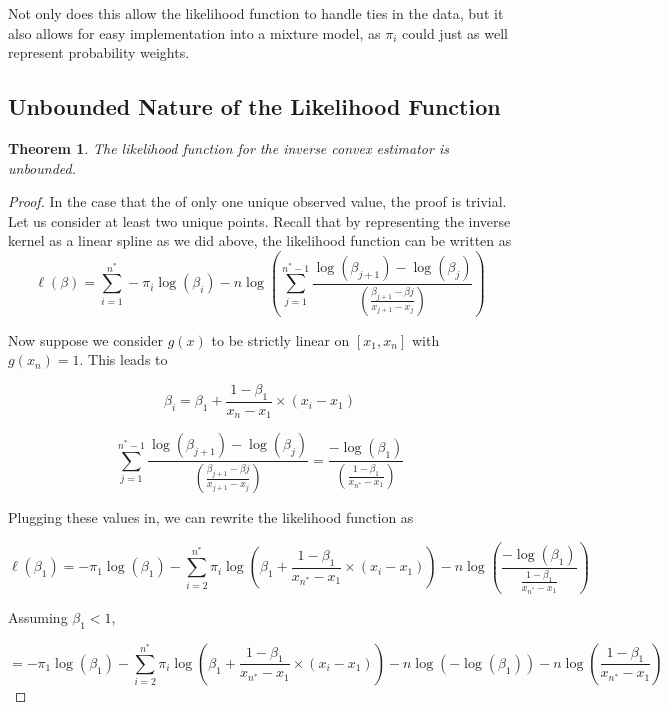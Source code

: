 \documentclass[11pt]{article}
\newtheorem{thm}{Theorem}
\numberwithin{equation}{section}
\begin{document}
	Not only does this allow the likelihood function to handle ties in the data, but it also allows for easy implementation into a mixture model, as $\pi_i$ could just as well represent probability weights. 



	{\subsection{Unbounded Nature of the Likelihood Function} } 
	
	\begin{thm}
	\label{thm3}
	The likelihood function for the inverse convex estimator is unbounded.
	\end{thm}
	
	\begin{proof}
	
	In the case that the of only one unique observed value, the proof is trivial. Let us consider at least two unique points. Recall that by representing the inverse kernel as a linear spline as we did above, the likelihood function can be written as 
	\[
	\ell(\beta) = \sum_{i = 1}^{n^*} -\pi_i \log(\beta_i) - n \log \left( \displaystyle \sum_{j=1}^{n^*-1} \frac{ \log (\beta_{j+1}) - \log (\beta_j) }  { \left( \frac{ \beta_{j+1} - \beta{j} } {x_{j+1} - x_j} \right) } \right)
	\]
	
	Now suppose we consider $g(x)$ to be strictly linear on $[x_1, x_n]$ with $g(x_n) = 1$.  This leads to 
	
	\[
	\beta_i = \beta_1 + \frac{1 - \beta_1} {x_n - x_1} \times (x_i - x_1)
	\]
	
	\[
	\sum_{j=1}^{n^*-1} \frac{ \log (\beta_{j+1}) - \log (\beta_j) }  { \left( \frac{ \beta_{j+1} - \beta{j} } {x_{j+1} - x_j} \right) } =
	\frac{  - \log (\beta_1) }  { \left( \frac{ 1 - \beta_{1} } {x_{n^*} - x_1} \right) }
	\]
	
	Plugging these values in, we can rewrite the likelihood function as 
	
	
	\[
	\ell(\beta_1)= -\pi_1 \log(\beta_1)  - \displaystyle \sum_{i = 2}^{n^*}  \pi_i \log \left( \beta_1 + \frac{1 - \beta_1} {x_{n^*} - x_1} \times (x_i - x_1) \right) - n \log \left( \frac{ - \log(\beta_1)}{ \frac {1 - \beta_1} {x_{n^*} - x_1} } \right)
	\]

	Assuming $\beta_1 < 1$, 

	\[
	= -\pi_1 \log(\beta_1)  - \displaystyle \sum_{i = 2}^{n^*} \pi_i \log \left( \beta_1 + \frac{1 - \beta_1} {x_{n^*} - x_1} \times (x_i - x_1) \right)  - n \log \left( - \log(\beta_1) \right) - n\log \left( \frac {1 - \beta_1} {x_{n^*} - x_1} \right)	
	\]
	

\end{proof}
\end{document}

